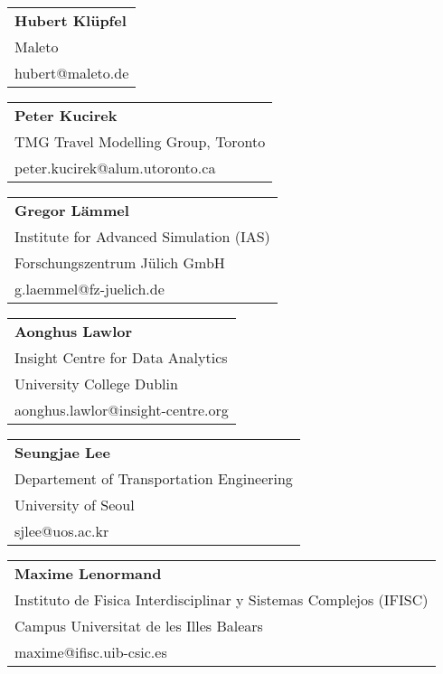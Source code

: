\begin{tabular}[width=0.48\textwidth]{@{}l}
\textbf{Hubert Klüpfel} \\
Maleto\\
hubert@maleto.de \\
\end{tabular}

\begin{tabular}[width=0.48\textwidth]{@{}l}
\textbf{Peter Kucirek} \\
TMG Travel Modelling Group, Toronto \\
peter.kucirek@alum.utoronto.ca  \\
\end{tabular}

\begin{tabular}[width=0.48\textwidth]{@{}l}
\textbf{Gregor Lämmel} \\
Institute for Advanced Simulation (IAS) \\
Forschungszentrum Jülich GmbH \\
g.laemmel@fz-juelich.de \\
\end{tabular}

\begin{tabular}[width=0.48\textwidth]{@{}l}
\textbf{Aonghus Lawlor} \\
Insight Centre for Data Analytics \\
University College Dublin \\
aonghus.lawlor@insight-centre.org \\
\end{tabular}

\begin{tabular}[width=0.48\textwidth]{@{}l}
\textbf{Seungjae Lee} \\
Departement of Transportation Engineering \\
University of Seoul \\
sjlee@uos.ac.kr \\
\end{tabular}

\begin{tabular}[width=0.48\textwidth]{@{}l}
\textbf{Maxime Lenormand} \\
Instituto de Fisica Interdisciplinar y Sistemas Complejos (IFISC) \\
Campus Universitat de les Illes Balears \\
maxime@ifisc.uib-csic.es   \\
\end{tabular}

